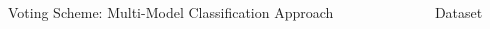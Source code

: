 \documentclass[final,hyperref={pdfpagelabels=false}]{beamer}
\begin{document}
\begin{frame}[t]
\begin{columns}[t]
\begin{column}{.465\textwidth}
\begin{block}{Voting Scheme: Multi-Model Classification Approach}

\end{block}


\end{column} %

\begin{column}{.03\textwidth}\end{column} %
 
\begin{column}{.465\textwidth} %


\begin{block}{Dataset \cite{twinanda2015data}}


\end{block}
\end{column}
\end{columns}
\end{frame}
\end{document}

